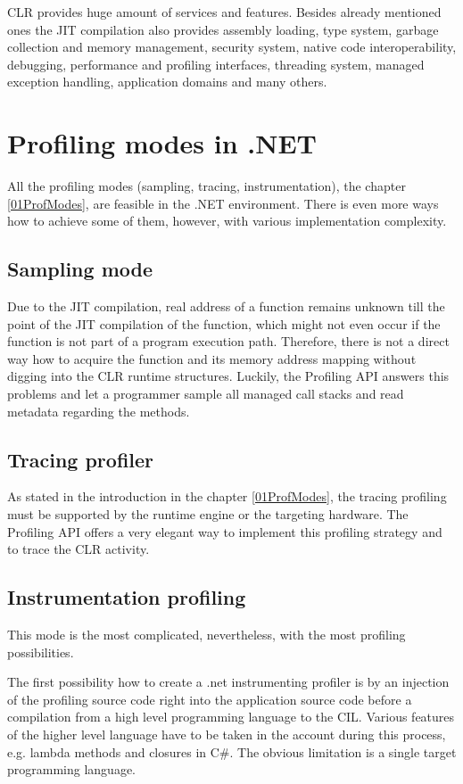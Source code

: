 CLR provides huge amount of services and features. Besides already mentioned ones the JIT compilation also provides assembly loading, type system, garbage collection and memory management, security system, native code interoperability, debugging, performance and profiling interfaces, threading system, managed exception handling, application domains and many others.

\section{Profiling modes in .NET}
All the profiling modes (sampling, tracing, instrumentation), the chapter \ref{01ProfModes}, are feasible in the .NET environment. There is even more ways how to achieve some of them, however, with various implementation complexity. 

\subsection{Sampling mode}
Due to the JIT compilation, real address of a function remains unknown till the point of the JIT compilation of the function, which might not even occur if the function is not part of a program execution path. Therefore, there is not a direct way how to acquire the function and its memory address mapping without digging into the CLR runtime structures. Luckily, the Profiling API answers this problems and let a programmer sample all managed call stacks and read metadata regarding the methods.

\subsection{Tracing profiler}
As stated in the introduction in the chapter \ref{01ProfModes}, the tracing profiling must be supported by the runtime engine or the targeting hardware. The Profiling API offers a very elegant way to implement this profiling strategy and to trace the CLR activity.

\subsection{Instrumentation profiling}
This mode is the most complicated, nevertheless, with the most profiling possibilities. 

The first possibility how to create a .net instrumenting profiler is by an injection of the profiling source code right into the application source code before a compilation from a high level programming language to the CIL. Various features of the higher level language have to be taken in the account during this process, e.g. lambda methods and closures in C\#. The obvious limitation is a single target programming language.

